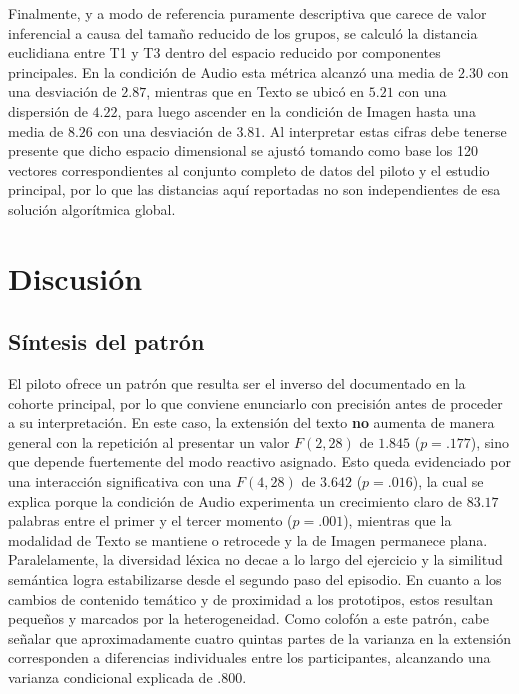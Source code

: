 \documentclass[12pt]{article}
\begin{document}
	Finalmente, y a modo de referencia puramente descriptiva que carece de valor inferencial a causa del tamaño reducido de los grupos, se calculó la distancia euclidiana entre T1 y T3 dentro del espacio reducido por componentes principales. En la condición de Audio esta métrica alcanzó una media de $2.30$ con una desviación de $2.87$, mientras que en Texto se ubicó en $5.21$ con una dispersión de $4.22$, para luego ascender en la condición de Imagen hasta una media de $8.26$ con una desviación de $3.81$. Al interpretar estas cifras debe tenerse presente que dicho espacio dimensional se ajustó tomando como base los 120 vectores correspondientes al conjunto completo de datos del piloto y el estudio principal, por lo que las distancias aquí reportadas no son independientes de esa solución algorítmica global.
	
	\section{Discusión}
	
	\subsection{Síntesis del patrón}
	
	El piloto ofrece un patrón que resulta ser el inverso del documentado en la cohorte principal, por lo que conviene enunciarlo con precisión antes de proceder a su interpretación. En este caso, la extensión del texto \textbf{no} aumenta de manera general con la repetición al presentar un valor $F(2,28)$ de $1.845$ ($p = .177$), sino que depende fuertemente del modo reactivo asignado. Esto queda evidenciado por una interacción significativa con una $F(4,28)$ de $3.642$ ($p = .016$), la cual se explica porque la condición de Audio experimenta un crecimiento claro de $83.17$ palabras entre el primer y el tercer momento ($p = .001$), mientras que la modalidad de Texto se mantiene o retrocede y la de Imagen permanece plana. Paralelamente, la diversidad léxica no decae a lo largo del ejercicio y la similitud semántica logra estabilizarse desde el segundo paso del episodio. En cuanto a los cambios de contenido temático y de proximidad a los prototipos, estos resultan pequeños y marcados por la heterogeneidad. Como colofón a este patrón, cabe señalar que aproximadamente cuatro quintas partes de la varianza en la extensión corresponden a diferencias individuales entre los participantes, alcanzando una varianza condicional explicada de $.800$.
	
\end{document}
